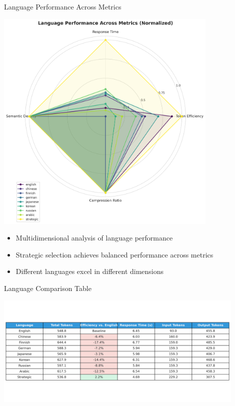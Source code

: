 \documentclass{beamer}
\begin{document}
\begin{frame}{Language Performance Across Metrics}
    \begin{center}
        \includegraphics[width=0.8\textwidth]{visualizations/presentation/language_radar_chart.png}
    \end{center}
    
    \begin{itemize}
        \item Multidimensional analysis of language performance
        \item Strategic selection achieves balanced performance across metrics
        \item Different languages excel in different dimensions
    \end{itemize}
\end{frame}

\begin{frame}{Language Comparison Table}
    \begin{center}
        \includegraphics[width=0.9\textwidth]{visualizations/presentation/language_comparison_table.png}
    \end{center}
\end{frame}
\end{document}
